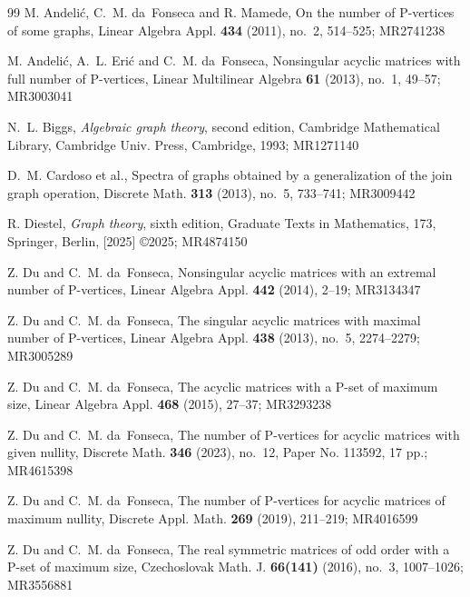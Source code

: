 \documentclass[12pt,reqno]{amsart}
\theoremstyle{definition}
\numberwithin{equation}{subsection}
\numberwithin{equation}{section}
\begin{document}
\begin{thebibliography}{99}
M. Andeli\'c, C.~M. da~Fonseca and R. Mamede, On the number of P-vertices of some graphs, Linear Algebra Appl. {\bf 434} (2011), no.~2, 514--525; MR2741238

M. Andeli\'c, A.~L. Eri\'c{} and C.~M. da~Fonseca, Nonsingular acyclic matrices with full number of P-vertices, Linear Multilinear Algebra {\bf 61} (2013), no.~1, 49--57; MR3003041

N.~L. Biggs, {\it Algebraic graph theory}, second edition, 
Cambridge Mathematical Library, Cambridge Univ. Press, Cambridge, 1993; MR1271140

 D.~M. Cardoso et al., Spectra of graphs obtained by a generalization of the join graph operation, Discrete Math. {\bf 313} (2013), no.~5, 733--741; MR3009442

R. Diestel, {\it Graph theory}, sixth edition, 
Graduate Texts in Mathematics, 173, Springer, Berlin, [2025] \copyright 2025; MR4874150

 Z. Du and C.~M. da~Fonseca, Nonsingular acyclic matrices with an extremal number of P-vertices, Linear Algebra Appl. {\bf 442} (2014), 2--19; MR3134347

Z. Du and C.~M. da~Fonseca, The singular acyclic matrices with maximal number of P-vertices, Linear Algebra Appl. {\bf 438} (2013), no.~5, 2274--2279; MR3005289

 Z. Du and C.~M. da~Fonseca, The acyclic matrices with a P-set of maximum size, Linear Algebra Appl. {\bf 468} (2015), 27--37; MR3293238

 Z. Du and C.~M. da~Fonseca, The number of P-vertices for acyclic matrices with given nullity, Discrete Math. {\bf 346} (2023), no.~12, Paper No. 113592, 17 pp.; MR4615398

 Z. Du and C.~M. da~Fonseca, The number of P-vertices for acyclic matrices of maximum nullity, Discrete Appl. Math. {\bf 269} (2019), 211--219; MR4016599

 Z. Du and C.~M. da~Fonseca, The real symmetric matrices of odd order with a P-set of maximum size, Czechoslovak Math. J. {\bf 66(141)} (2016), no.~3, 1007--1026; MR3556881


\end{thebibliography}
\end{document}
